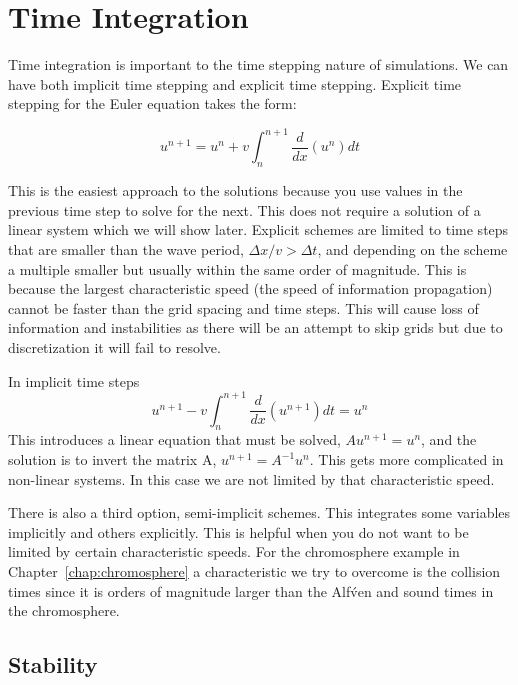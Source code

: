 \documentclass[12pt,upcase]{umlthesis}
\begin{document}
\section{Time Integration}\label{sec:timeintegration}

Time integration is important to the time stepping nature of simulations. We can have both implicit time stepping and explicit time stepping. Explicit time stepping for the Euler equation takes the form:

\begin{equation}\label{eq:explicit}
	u^{n+1} = u^n + v\int^{n+1}_n \frac{d}{dx}(u^{n}) dt
\end{equation}

This is the easiest approach to the solutions because you use values in the previous time step to solve for the next. This does not require a solution of a linear system which we will show later. Explicit schemes are limited to time steps that are smaller than the wave period, $\Delta x / v > \Delta t$, and depending on the scheme a multiple smaller but usually within the same order of magnitude. This is because the largest characteristic speed (the speed of information propagation) cannot be faster than the grid spacing and time steps. This will cause loss of information and instabilities as there will be an attempt to skip grids but due to discretization it will fail to resolve.

In implicit time steps
\begin{equation}\label{eq:implicit}
	u^{n+1} - v\int^{n+1}_n \frac{d}{dx}(u^{n+1}) dt = u^n 
\end{equation}
This introduces a linear equation that must be solved, $Au^{n+1} = u^n$, and the solution is to invert the matrix A, $u^{n+1} = A^{-1} u^n$. This gets more complicated in non-linear systems. In this case we are not limited by that characteristic speed.

There is also a third option, semi-implicit schemes. This integrates some variables implicitly and others explicitly. This is helpful when you do not want to be limited by certain characteristic speeds. For the chromosphere example in Chapter~\ref{chap:chromosphere} a characteristic we try to overcome is the collision times since it is orders of magnitude larger than the Alf\'ven and sound times in the chromosphere.

\subsection{Stability}\label{sec:stability}
\end{document}
